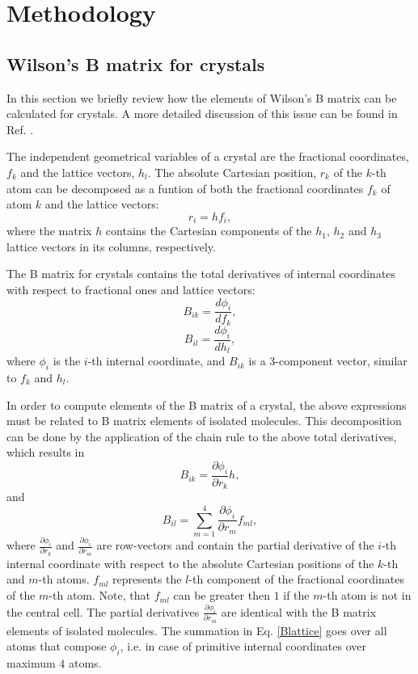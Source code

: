 \documentclass[prl,aps,preprint,superbib,12pt]{revtex4}
\begin{document}
\section{Methodology}
\subsection{Wilson's B matrix for crystals} \label{crystalBmat}
In this section we briefly review how the elements of Wilson's
B matrix can be calculated for crystals. A more detailed discussion 
of this issue can be found in Ref. .

The independent geometrical variables of a crystal are the 
fractional coordinates, $f_{k}$ and the lattice vectors, $h_{l}$.
The absolute Cartesian position, $r_{k}$ of the $k$-th atom
can be decomposed as a funtion of both the fractional coordinates 
$f_{k}$ of atom $k$ and the lattice vectors:
\begin{equation}
r_{i} = h f_{i} ,
\end{equation}
where the matrix $h$ contains the Cartesian components of the 
$h_{1}$, $h_{2}$ and $h_{3}$ lattice vectors in its 
columns, respectively.

The B matrix for crystals contains the total derivatives 
of internal coordinates with respect to fractional ones
and lattice vectors:
\begin{equation}
B_{ik} = \frac{d \phi_{i}}{d f_{k}} ,
\end{equation}
\begin{equation}
B_{il} = \frac{d \phi_{i}}{d h_{l}} ,
\end{equation}
where $\phi_{i}$ is the $i$-th internal coordinate,
and $B_{ik}$ is a 3-component vector, similar to $f_{k}$ and $h_{l}$.

In order to compute elements of the B matrix of a crystal, the above
expressions must be
related to B matrix elements of isolated molecules. This decomposition
can be done by the application of the chain rule to the above 
total derivatives, which results in
\begin{equation}
B_{ik} =  \frac{\partial \phi_{i}}{\partial r_{k}} h ,
\end{equation}
and 
\begin{equation} \label{Blattice}
B_{il} =  \sum_{m=1}^{4} 
          \frac{\partial \phi_{i}}{\partial r_{m}} f_{ml},
\end{equation}
where $\frac{\partial \phi_{i}}{\partial r_{k}}$ and 
$\frac{\partial \phi_{i}}{\partial r_{m}}$ are row-vectors and contain
the partial derivative of the $i$-th internal coordinate
with respect to the absolute Cartesian positions of 
the $k$-th and $m$-th atoms. $f_{ml}$ represents the
$l$-th component of the fractional coordinates of the $m$-th atom.
Note, that $f_{ml}$ can be greater then $1$ if the $m$-th atom is not 
in the central cell.
The partial derivatives $\frac{\partial \phi_{i}}{\partial r_{m}}$ 
are identical
with the B matrix elements of isolated molecules. The summation
in Eq. \ref{Blattice} goes over all atoms that compose $\phi_{i}$,
i.e. in case of primitive internal coordinates over maximum $4$ atoms. 
\end{document}
